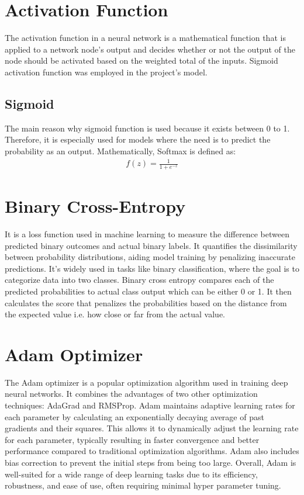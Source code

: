\section{Activation Function}
\vspace{-18pt}
The activation function in a neural network is a mathematical function that is applied to a network node's output and decides whether or not the output of the node should be activated based on the weighted total of the inputs. Sigmoid activation function was employed in the project's model.
\subsection{Sigmoid}
\vspace{-18pt}
The main reason why sigmoid function is used because it exists between 0 to 1. Therefore, it is especially used for models where the need is to predict the probability as an output.  Mathematically, Softmax is defined as: 
\begin{eqnarray}
	f(z) = \frac{1}{1 + e^{-z}}
\end{eqnarray}
\section{Binary Cross-Entropy}
\vspace{-18pt}
It is a loss function used in machine learning to measure the difference between predicted binary outcomes and actual binary labels. It quantifies the dissimilarity between probability distributions, aiding model training by penalizing inaccurate predictions. It’s widely used in tasks like binary classification, where the goal is to categorize data into two classes. Binary cross entropy compares each of the predicted probabilities to actual class output which can be either 0 or 1. It then calculates the score that penalizes the probabilities based on the distance from the expected value i.e. how close or far from the actual value.
\section{Adam Optimizer}
\vspace{-18pt}
The Adam optimizer is a popular optimization algorithm used in training deep neural networks. It combines the advantages of two other optimization techniques: AdaGrad and RMSProp. Adam maintains adaptive learning rates for each parameter by calculating an exponentially decaying average of past gradients and their squares. This allows it to dynamically adjust the learning rate for each parameter, typically resulting in faster convergence and better performance compared to traditional optimization algorithms. Adam also includes bias correction to prevent the initial steps from being too large. Overall, Adam is well-suited for a wide range of deep learning tasks due to its efficiency, robustness, and ease of use, often requiring minimal hyper parameter tuning.
